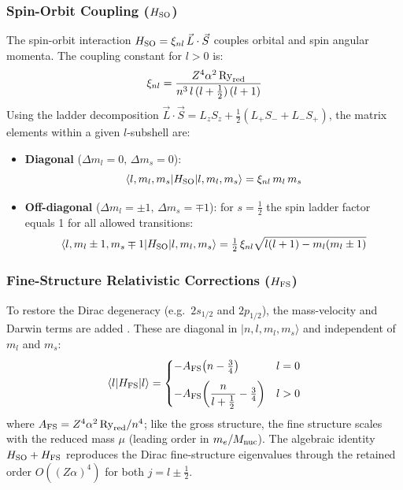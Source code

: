 \documentclass[11pt,a4paper]{article}
\numberwithin{equation}{section}
\begin{document}
\subsubsection{\texorpdfstring{Spin-Orbit Coupling ($H_{\rm SO}$)}{Spin-Orbit Coupling (H SO)}}
The spin-orbit interaction $H_{\rm SO} = \xi_{nl}\,\vec{L}\cdot\vec{S}$ couples orbital and spin angular momenta. The coupling constant for $l > 0$ is:
\begin{equation}
\xi_{nl} = \frac{Z^4 \alpha^2\,\mathrm{Ry}_{\rm red}}{n^3\,l\,(l + \tfrac{1}{2})\,(l + 1)}
\end{equation}
Using the ladder decomposition $\vec{L}\cdot\vec{S} = L_z S_z + \tfrac{1}{2}(L_+ S_- + L_- S_+)$, the matrix elements within a given $l$-subshell are:
\begin{itemize}
    \item \textbf{Diagonal} ($\Delta m_l = 0,\,\Delta m_s = 0$):
    \begin{equation}
    \langle l, m_l, m_s | H_{\rm SO} | l, m_l, m_s\rangle = \xi_{nl}\,m_l\,m_s
    \end{equation}
    \item \textbf{Off-diagonal} ($\Delta m_l = \pm 1,\,\Delta m_s = \mp 1$): for $s = \tfrac{1}{2}$ the spin ladder factor equals 1 for all allowed transitions:
    \begin{equation}
    \langle l, m_l \pm 1, m_s \mp 1 | H_{\rm SO} | l, m_l, m_s\rangle
    = \tfrac{1}{2}\,\xi_{nl}\sqrt{l(l+1) - m_l(m_l \pm 1)}
    \end{equation}
\end{itemize}

\subsubsection{\texorpdfstring{Fine-Structure Relativistic Corrections ($H_{\rm FS}$)}{Fine-Structure Relativistic Corrections (H FS)}}
To restore the Dirac degeneracy (e.g.\ $2s_{1/2}$ and $2p_{1/2}$), the mass-velocity and Darwin terms are added \cite{bethesalpeter}. These are diagonal in $|n, l, m_l, m_s\rangle$ and independent of $m_l$ and $m_s$:
\begin{equation}
\langle l | H_{\rm FS} | l \rangle =
\begin{cases}
-A_{\rm FS}\!\left(n - \tfrac{3}{4}\right) & l = 0 \\[6pt]
-A_{\rm FS}\!\left(\dfrac{n}{l + \tfrac{1}{2}} - \tfrac{3}{4}\right) & l > 0
\end{cases}
\end{equation}
where $A_{\rm FS} = Z^4\alpha^2\,\mathrm{Ry}_{\rm red}/n^4$; like the gross structure, the fine structure scales with the reduced mass $\mu$ (leading order in $m_e/M_{\rm nuc}$). The algebraic identity $H_{\rm SO} + H_{\rm FS}$ reproduces the Dirac fine-structure eigenvalues through the retained order $O((Z\alpha)^4)$ for both $j = l \pm \tfrac{1}{2}$.
\end{document}
